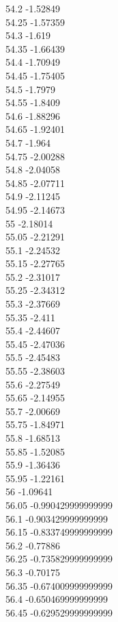 {54.2	-1.52849\\
54.25	-1.57359\\
54.3	-1.619\\
54.35	-1.66439\\
54.4	-1.70949\\
54.45	-1.75405\\
54.5	-1.7979\\
54.55	-1.8409\\
54.6	-1.88296\\
54.65	-1.92401\\
54.7	-1.964\\
54.75	-2.00288\\
54.8	-2.04058\\
54.85	-2.07711\\
54.9	-2.11245\\
54.95	-2.14673\\
55	-2.18014\\
55.05	-2.21291\\
55.1	-2.24532\\
55.15	-2.27765\\
55.2	-2.31017\\
55.25	-2.34312\\
55.3	-2.37669\\
55.35	-2.411\\
55.4	-2.44607\\
55.45	-2.47036\\
55.5	-2.45483\\
55.55	-2.38603\\
55.6	-2.27549\\
55.65	-2.14955\\
55.7	-2.00669\\
55.75	-1.84971\\
55.8	-1.68513\\
55.85	-1.52085\\
55.9	-1.36436\\
55.95	-1.22161\\
56	-1.09641\\
56.05	-0.990429999999999\\
56.1	-0.903429999999999\\
56.15	-0.833749999999999\\
56.2	-0.77886\\
56.25	-0.735829999999999\\
56.3	-0.70175\\
56.35	-0.674009999999999\\
56.4	-0.650469999999999\\
56.45	-0.629529999999999\\
}
